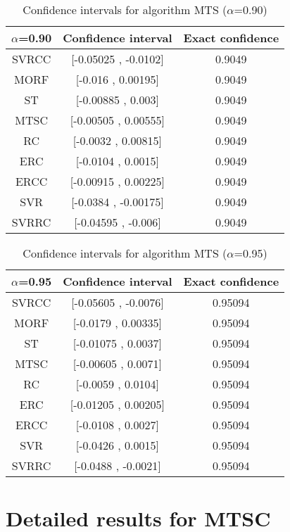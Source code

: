 \documentclass[a4paper,10pt]{article}
\begin{document}
\begin{table}[!htp]
\centering\small
\begin{tabular}{
|c|c|c|}
\hline
 $\alpha$=0.90 & Confidence interval & Exact confidence \\ \hline 
SVRCC & [-0.05025 , -0.0102] & 0.9049\\ \hline 
MORF & [-0.016 , 0.00195] & 0.9049\\ \hline 
ST & [-0.00885 , 0.003] & 0.9049\\ \hline 
MTSC & [-0.00505 , 0.00555] & 0.9049\\ \hline 
RC & [-0.0032 , 0.00815] & 0.9049\\ \hline 
ERC & [-0.0104 , 0.0015] & 0.9049\\ \hline 
ERCC & [-0.00915 , 0.00225] & 0.9049\\ \hline 
SVR & [-0.0384 , -0.00175] & 0.9049\\ \hline 
SVRRC & [-0.04595 , -0.006] & 0.9049\\ \hline 

\end{tabular}
\caption{Confidence intervals for algorithm MTS ($\alpha$=0.90)}
\end{table}
\begin{table}[!htp]
\centering\small
\begin{tabular}{
|c|c|c|}
\hline
 $\alpha$=0.95 & Confidence interval & Exact confidence \\ \hline 
SVRCC & [-0.05605 , -0.0076] & 0.95094\\ \hline 
MORF & [-0.0179 , 0.00335] & 0.95094\\ \hline 
ST & [-0.01075 , 0.0037] & 0.95094\\ \hline 
MTSC & [-0.00605 , 0.0071] & 0.95094\\ \hline 
RC & [-0.0059 , 0.0104] & 0.95094\\ \hline 
ERC & [-0.01205 , 0.00205] & 0.95094\\ \hline 
ERCC & [-0.0108 , 0.0027] & 0.95094\\ \hline 
SVR & [-0.0426 , 0.0015] & 0.95094\\ \hline 
SVRRC & [-0.0488 , -0.0021] & 0.95094\\ \hline 

\end{tabular}
\caption{Confidence intervals for algorithm MTS ($\alpha$=0.95)}
\end{table}

 \clearpage 


\section{Detailed results for MTSC}
\end{document}
